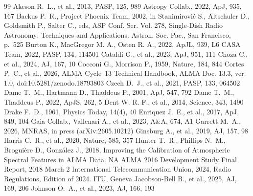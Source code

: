 \documentclass[twocolumn,twocolappendix,numberedappendix,appendixfloats]{openjournal}
\begin{document}
\begin{thebibliography}{99}
 Akeson R.~L., et al., 2013, PASP, 125, 989
 Astropy Collab., 2022, ApJ, 935, 167
 Backus P.~R., Project Phoenix Team, 2002, in Stanimirovi\'{c} S., Altschuler D., Goldsmith P., Salter C., eds, ASP Conf. Ser. Vol. 278, Single-Dish Radio Astronomy: Techniques and Applications. Astron. Soc. Pac., San Francisco, p.~525
 Burton K., MacGregor M. A., Osten R. A., 2022, ApJL, 939, L6
 CASA Team, 2022, PASP, 134, 114501
 Cataldi G., et al., 2023, ApJ, 951, 111
 Choza C., et al., 2024, AJ, 167, 10
 Cocconi G., Morrison P., 1959, Nature, 184, 844
 Cortes P.~C., et al., 2026, ALMA Cycle~13 Technical Handbook, ALMA Doc. 13.3, ver. 1.0, doi:10.5281/zenodo.18793803
 Czech D.~J., et al., 2021, PASP, 133, 064502
 Dame T.~M., Hartmann D., Thaddeus P., 2001, ApJ, 547, 792
 Dame T.~M., Thaddeus P., 2022, ApJS, 262, 5
 Dent W. R. F., et al., 2014, Science, 343, 1490
 Drake F.~D., 1961, Physics Today, 14(4), 40
 Enriquez J.~E., et al., 2017, ApJ, 849, 104
 Gaia Collab., Vallenari A., et al., 2023, A\&A, 674, A1
 Garrett M.~A., 2026, MNRAS, in press (arXiv:2605.10212)
 Ginsburg A., et al., 2019, AJ, 157, 98
 Harris C.~R., et al., 2020, Nature, 585, 357
 Hunter T.~R., Phillips N.~M., Brogui\`{e}re D., Gonz\'{a}lez J., 2018, Improving the Calibration of Atmospheric Spectral Features in ALMA Data. NA ALMA 2016 Development Study Final Report, 2018 March 2
 International Telecommunication Union, 2024, Radio Regulations, Edition of 2024. ITU, Geneva
 Jacobson-Bell B., et al., 2025, AJ, 169, 206
 Johnson O.~A., et al., 2023, AJ, 166, 193

\end{thebibliography}
\end{document}
